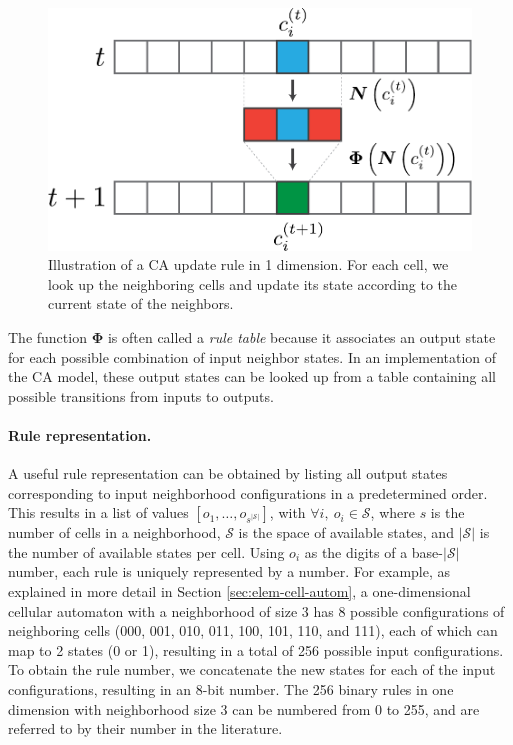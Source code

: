 \begin{figure}[htbp]
  \centering
 \includegraphics[width=.7\linewidth]{figures/ca_base}
  \caption{Illustration of a \acl{CA} update rule in 1 dimension. For each cell,
  we look up the neighboring cells and update its state according to the current
state of the neighbors.}
  \label{fig:ca_base}
\end{figure}

The function $\boldsymbol{\Phi}$ is often called a \emph{rule table} because it
associates an output state for each possible combination of input neighbor
states. In an implementation of the \ac{CA} model, these output states can be
looked up from a table containing all possible transitions from inputs to
outputs.

\paragraph{Rule representation.}
A useful rule representation can be obtained by listing all output states
corresponding to input neighborhood configurations in a predetermined order. This 
results in a list of values $[o_1, \ldots, o_{s^{|\mathcal{S}|}}]$, with 
$\forall i,\ o_{i} \in \mathcal{S}$, where $s$ is
the number of cells in a neighborhood, $\mathcal{S}$ is the space of available states, and
$|\mathcal{S}|$ is the number of available states per cell. Using $o_{i}$ as the
digits of a base-$|\mathcal{S}|$ number, each rule is uniquely represented by a number.
For example, as explained in more detail in Section \ref{sec:elem-cell-autom},
a one-dimensional cellular automaton with a neighborhood of size 3 has 8 possible configurations of neighboring cells (000, 001, 010, 011, 100, 101, 110, and 111), each of which can map to 2 states (0 or 1), resulting in a total of 256 possible input configurations. To obtain the rule number, we concatenate the new states for each of the input configurations, resulting in an 8-bit number. 
The 256 binary rules in one dimension with neighborhood size 3 can be numbered
from 0 to 255, and are referred to by their number in the literature.

